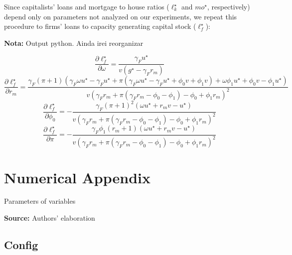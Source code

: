 \documentclass[11pt]{article}
\begin{document}
Since capitalists' loans and mortgage to house ratios (\(\ell^{\star}_{k}\) and \(mo^{\star}\), respectively) depend only on parameters not analyzed on our experiments, we repeat this  procedure to firms' loans to capacity generating capital stock (\(\ell^{\star}_f\)):

\textbf{Nota:} Output python. Ainda irei reorganizar

\begin{equation}\frac{\partial \ell_f^{\star}}{\partial \omega} = \frac{\gamma_{F} u^{\star}}{v \left(g^\star - \gamma_{F} r_{m}\right)}\end{equation}
\begin{equation}\frac{\partial \ell_f^{\star}}{\partial r_{m}} = \frac{\gamma_{F} \left(\pi + 1\right) \left(\gamma_{F} \omega u^{\star} - \gamma_{F} u^{\star} + \pi \left(\gamma_{F} \omega u^{\star} - \gamma_{F} u^{\star} + \phi_{0} v + \phi_{1} v\right) + \omega \phi_{1} u^{\star} + \phi_{0} v - \phi_{1} u^{\star}\right)}{v \left(\gamma_{F} r_{m} + \pi \left(\gamma_{F} r_{m} - \phi_{0} - \phi_{1}\right) - \phi_{0} + \phi_{1} r_{m}\right)^{2}}\end{equation}
\begin{equation}\frac{\partial \ell_f^{\star}}{\partial \phi_{0}} = - \frac{\gamma_{F} \left(\pi + 1\right)^{2} \left(\omega u^{\star} + r_{m} v - u^{\star}\right)}{v \left(\gamma_{F} r_{m} + \pi \left(\gamma_{F} r_{m} - \phi_{0} - \phi_{1}\right) - \phi_{0} + \phi_{1} r_{m}\right)^{2}}\end{equation}
\begin{equation}\frac{\partial \ell_f^{\star}}{\partial \pi} = - \frac{\gamma_{F} \phi_{1} \left(r_{m} + 1\right) \left(\omega u^{\star} + r_{m} v - u^{\star}\right)}{v \left(\gamma_{F} r_{m} + \pi \left(\gamma_{F} r_{m} - \phi_{0} - \phi_{1}\right) - \phi_{0} + \phi_{1} r_{m}\right)^{2}}\end{equation}




\section{Numerical Appendix}
\label{sec:orgc51f06a}
\label{append:Data}


\begin{table}[H]
\caption{Parameters of variables}
\centering
\label{tab:param}

\caption*{\textbf{Source:} Authors' elaboration}
\end{table}


\subsection{Config}
\label{sec:org78cd6c3}
\end{document}

